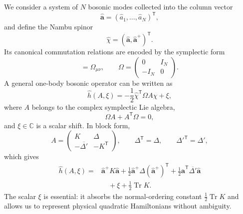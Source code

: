 \documentclass[twocolumn,aps,prb,10pt,amsmath,amssymb,amsthm,superscriptaddress]{revtex4-2}
\newcommand{\Tr}{\operatorname{Tr}}
\newcommand{\trans}{\mathsf{T}}
\newcommand{\bb}[1]{\bm{#1}}
\theoremstyle{remark}
\begin{document}
We consider a system of $N$ bosonic modes collected into the column vector
\begin{equation}
    \hat{\bb a} = (\hat a_1,\ldots,\hat a_N)^\trans,
\end{equation}
and define the Nambu spinor
\begin{equation}
    \hat\chi = (\hat{\bb a},\hat{\bb a}^+)^\trans.
\end{equation}
Its canonical commutation relations are encoded by the symplectic form
\begin{equation}
    [\hat\chi_\mu,\hat\chi_\nu] = \Omega_{\mu\nu},
    \qquad
    \Omega =
    \begin{pmatrix}
        0 & I_N \\
        -I_N & 0
    \end{pmatrix}.
\end{equation}
A general one-body bosonic operator can be written as
\begin{equation}
    \hat h(A,\xi) = -\frac12 \hat\chi^\trans \Omega A \hat\chi + \xi,
    \label{eq:hAdef}
\end{equation}
where $A$ belongs to the complex symplectic Lie algebra,
\begin{equation}
    \Omega A + A^\trans \Omega = 0,
    \label{eq:symplectic_condition}
\end{equation}
and $\xi\in\mathbb C$ is a scalar shift. In block form,
\begin{equation}
    A =
    \begin{pmatrix}
        K & \Delta \\
        -\overline{\Delta'} & -K^\trans
    \end{pmatrix},
    \qquad
    \Delta^\trans = \Delta,
    \qquad
    \Delta'^\trans = \Delta',
\end{equation}
which gives
\begin{equation}
\begin{aligned}
    \hat h(A,\xi)
    ={}& \hat{\bb a}^+ K\hat{\bb a}
    + \frac12\hat{\bb a}^+\Delta(\hat{\bb a}^+)^\trans
    + \frac12\hat{\bb a}^\trans\overline{\Delta'}\hat{\bb a} \\
    &\quad + \xi + \frac12\Tr K.
\end{aligned}
\label{eq:block_form_h}
\end{equation}
The scalar $\xi$ is essential: it absorbs the normal-ordering constant $\frac12\Tr K$ and allows us to represent physical quadratic Hamiltonians without ambiguity.
\end{document}
